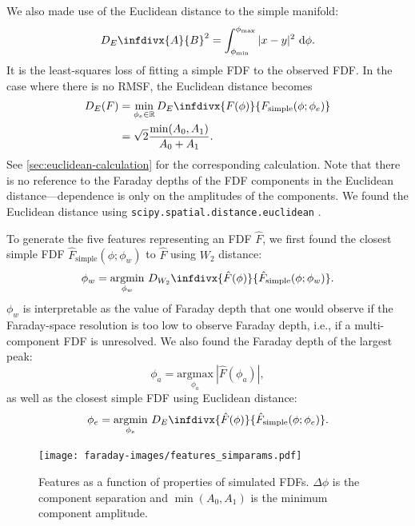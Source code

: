       We also made use of the Euclidean distance to the simple manifold:
      \begin{equation}
        \label{eq:faraday-euclidean}
        D_E\infdivx{A}{B}^2 = \int_{\phi_{\min}}^{\phi_{\max}} |x - y|^2\ \mathrm{d}\phi.\\
      \end{equation}
      It is the least-squares loss of fitting a simple FDF to the observed FDF. In the case where there is no RMSF, the Euclidean distance becomes
      \begin{align}
          D_{E}(F) &= \min_{\phi_e \in \mathbb{R}} D_E\infdivx{F(\phi)}{F_{\mathrm{simple}}(\phi; \phi_e)}\\
              &= \sqrt{2} \frac{\min(A_0, A_1)}{A_0 + A_1}.
      \end{align}
      See \autoref{sec:euclidean-calculation} for the corresponding calculation. Note that there is no reference to the Faraday depths of the FDF components in the Euclidean distance---dependence is only on the amplitudes of the components. We found the Euclidean distance using \texttt{scipy.spatial.distance.euclidean} \citep{scipy2020}.

      To generate the five features representing an FDF $\hat F$, we first found the closest simple FDF $\hat F_{\mathrm{simple}}(\phi; \phi_w)$ to $\hat F$ using $W_2$ distance:
      \begin{equation}
        \phi_w = \underset{\phi_w}{\mathrm{argmin}}\ D_{W_2}\infdivx{\hat F(\phi)}{\hat F_{\mathrm{simple}}(\phi; \phi_w)}.
      \end{equation}
      $\phi_w$ is interpretable as the value of Faraday depth that one would observe if the Faraday-space resolution is too low to observe Faraday depth, i.e., if a multi-component FDF is unresolved. We also found the Faraday depth of the largest peak:
      \begin{equation}
        \phi_a = \underset{\phi_a}{\mathrm{argmax}}\ |\hat F(\phi_a)|,
      \end{equation}
      as well as the closest simple FDF using Euclidean distance:
      \begin{equation}
        \phi_e = \underset{\phi_e}{\mathrm{argmin}}\ D_E\infdivx{\hat F(\phi)}{\hat F_{\mathrm{simple}}(\phi; \phi_e)}.
      \end{equation}

      \begin{figure}
        \centering
        \texttt{[image: faraday-images/features\_simparams.pdf]}
        \caption{\label{fig:faraday-features-simparams} Features as a function of properties of simulated FDFs. $\Delta \phi$ is the component separation and $\min(A_0, A_1)$ is the minimum component amplitude.}
      \end{figure}

